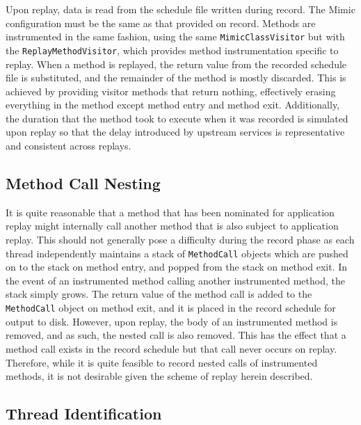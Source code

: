 \documentclass[]{final_report}
\begin{document}
Upon replay, data is read from the schedule file written during record. The Mimic configuration must be the same as that provided on record. Methods are instrumented in the same fashion, using the same \lstinline{MimicClassVisitor} but with the \lstinline{ReplayMethodVisitor}\noop{}, which provides method instrumentation specific to replay. When a method is replayed, the return value from the recorded schedule file is substituted, and the remainder of the method is mostly discarded. This is achieved by providing visitor methods that return nothing, effectively erasing everything in the method except method entry and method exit. Additionally, the duration that the method took to execute when it was recorded is simulated upon replay so that the delay introduced by upstream services is representative and consistent across replays.

\subsection{Method Call Nesting}

It is quite reasonable that a method that has been nominated for application replay might internally call another method that is also subject to application replay. This should not generally pose a difficulty during the record phase as each thread independently maintains a stack of \lstinline{MethodCall}\noop{} objects which are pushed on to the stack on method entry, and popped from the stack on method exit. In the event of an instrumented method calling another instrumented method, the stack simply grows. The return value of the method call is added to the \lstinline{MethodCall}\noop{} object on method exit, and it is placed in the record schedule for output to disk. However, upon replay, the body of an instrumented method is removed, and as such, the nested call is also removed. This has the effect that a method call exists in the record schedule but that call never occurs on replay. Therefore, while it is quite feasible to record nested calls of instrumented methods, it is not desirable given the scheme of replay herein described.

\subsection{Thread Identification \label{thread_identification}}
\end{document}
